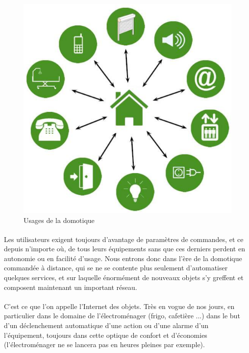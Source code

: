         \begin{figure}[h]
            \begin{center}
                \includegraphics[scale=0.4]{./images/cpl/partieDomotique.png}
            \end{center}
                \caption{ Usages de la domotique }
                \label{Usages de la domotique}
        \end{figure}

        \paragraph{}
Les utilisateurs exigent toujours d'avantage de paramètres de commandes, et ce depuis n'importe où,
de tous leurs équipements sans que ces derniers perdent en autonomie ou en facilité d'usage.
Nous entrons donc dans l’ère de la domotique commandée à distance, qui se ne se contente plus seulement d'automatiser quelques services,
et sur laquelle énormément de nouveaux objets s'y greffent et composent maintenant un important réseau.
        \paragraph{}
C’est ce que l’on appelle l’Internet des objets.
Très en vogue de nos jours, en particulier dans le domaine de l’électroménager (frigo, cafetière ...)
dans le but d'un déclenchement automatique d'une action ou d'une alarme d'un l'équipement,
toujours dans cette optique de confort et d'économies (l'électroménager ne se lancera pas en heures pleines par exemple).
